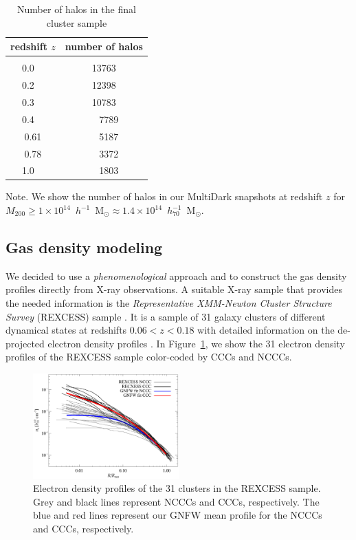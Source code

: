 \documentclass[traditabstract]{aa}
\begin{document}
\begin{table}[t]
\begin{center}
\caption{Number of halos in the final cluster sample}
\medskip
\begin{tabular}{cc}
\hline\hline
\phantom{\Big|}
redshift $z$ & number of halos \\
\hline\\[-0.5em]
 0.0~~ &  13763\\
 0.2~~ &  12398\\
 0.3~~ &  10783\\ 
 0.4~~ &   ~~7789\\ 
 0.61  &  ~~5187\\ 
 0.78  &  ~~3372\\ 
 1.0~~ &  ~~1803\\[0.5em]
\hline
\end{tabular}
\label{tab:z}
\end{center}
\footnotesize{Note. We show the number of halos in our MultiDark snapshots at redshift $z$ for $M_{200}\geq1\times10^{14}$~$h^{-1}$~M$_{\odot}\approx1.4\times10^{14}$~$h_{70}^{-1}$~M$_{\odot}$. }
\end{table}


\subsection{Gas density modeling}
\label{sec:2.2}

We decided to use a \emph{phenomenological} approach and to construct the gas
density profiles directly from X-ray observations. A suitable X-ray sample that
provides the needed information is the \emph{Representative XMM-Newton Cluster
  Structure Survey} (REXCESS) sample \citep{2008A&A...487..431C,
  2009A&A...498..361P}. It is a sample of 31 galaxy clusters of different
dynamical states at redshifts $0.06<z<0.18$ with detailed information on the
de-projected electron density profiles \citep{2008A&A...487..431C}. In
Figure~\ref{fig:gas_profiles}, we show the 31 electron density profiles of the
REXCESS sample color-coded by CCCs and NCCCs.

\begin{figure}[t]
\centering
\includegraphics[width=0.5\textwidth]{figures/gas_profiles.eps}
\caption{Electron density profiles of the 31 clusters in the REXCESS sample. Grey and black lines represent NCCCs and CCCs, respectively. The blue and red lines represent our GNFW mean profile for the NCCCs and CCCs, respectively.}
\label{fig:gas_profiles}
\end{figure}
\end{document}
